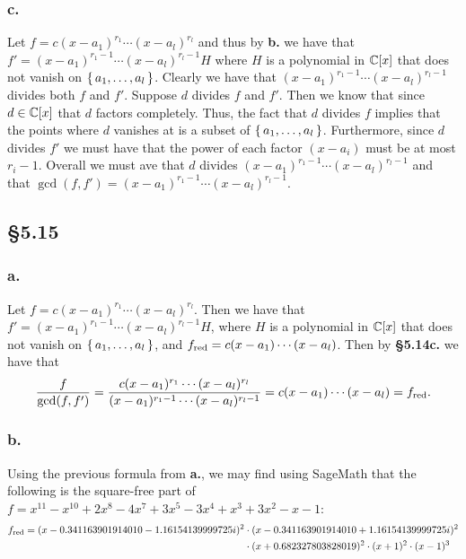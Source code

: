 \documentclass[letterpaper]{article}
\begin{document}
\subsubsection{c.}

Let $f = c(x - a_{1})^{r_{1}} \cdots (x - a_{l})^{r_{l}}$ and thus by \textbf{b.} we have that $f' = (x - a_{1})^{r_{1} - 1} \cdots (x - a_{l})^{r_{l} - 1} H$ where $H$ is a polynomial in $\mathbb{C}[x]$ that does not vanish on $\set{a_{1}, \ldots, a_{l}}$. Clearly we have that $(x - a_{1})^{r_{1} - 1} \cdots (x - a_{l})^{r_{l} - 1}$ divides both $f$ and $f'$. Suppose $d$ divides $f$ and $f'$. Then we know that since $d \in \mathbb{C}[x]$ that $d$ factors completely. Thus, the fact that $d$ divides $f$ implies that the points where $d$ vanishes at is a subset of $\set{a_{1}, \ldots, a_{l}}$. Furthermore, since $d$ divides $f'$ we must have that the power of each factor $(x -a_{i})$ must be at most $r_{i} - 1$. Overall we must ave that $d$ divides $(x - a_{1})^{r_{1} - 1} \cdots (x - a_{l})^{r_{l} - 1}$ and that $\gcd(f, f') = (x - a_{1})^{r_{1} - 1} \cdots (x - a_{l})^{r_{l} - 1}$.

\subsection{\S 5.15}

\subsubsection{a.}

Let $f = c(x - a_{1})^{r_{1}} \cdots (x - a_{l})^{r_{l}}$. Then we have that $f' = (x - a_{1})^{r_{1} - 1} \cdots (x - a_{l})^{r_{l} - 1} H$, where $H$ is a polynomial in $\mathbb{C}[x]$ that does not vanish on $\set{a_{1}, \ldots, a_{l}}$, and $f_{\text{red}} = c (x - a_{1}) \cdots (x - a_{l})$. Then by \textbf{\S 5.14c.} we have that
\[
  \frac{f}{\gcd(f, f')} = \frac{c(x - a_{1})^{r_{1}} \cdots (x - a_{l})^{r_{l}}}{(x - a_{1})^{r_{1} - 1} \cdots (x - a_{l})^{r_{l} - 1}} = c (x - a_{1}) \cdots (x - a_{l}) = f_{\text{red}}.
\]

\subsubsection{b.}

Using the previous formula from \textbf{a.}, we may find using SageMath that the following is the square-free part of $f = x^{11} - x^{10} + 2x^{8} - 4x^{7} + 3x^{5} - 3x^{4} + x^{3} + 3x^{2} - x - 1$:
\begin{equation*}
\begin{split}
  f_{\text{red}} = (x - 0.341163901914010 - 1.16154139999725i)^{2} &\cdot (x - 0.341163901914010 + 1.16154139999725i)^{2} \\
    &\cdot (x + 0.682327803828019)^{2} \cdot (x + 1)^{2} \cdot (x - 1)^{3}
\end{split}
\end{equation*}
\end{document}
